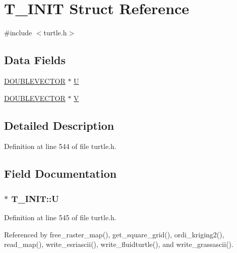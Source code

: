 \hypertarget{struct_t___i_n_i_t}{\section{T\-\_\-\-I\-N\-I\-T Struct Reference}
\label{struct_t___i_n_i_t}
}


{\ttfamily \#include $<$turtle.\-h$>$}

\subsection*{Data Fields}
\begin{DoxyCompactItemize}
\item 
\hyperlink{struct_d_o_u_b_l_e_v_e_c_t_o_r}{D\-O\-U\-B\-L\-E\-V\-E\-C\-T\-O\-R} $\ast$ \hyperlink{struct_t___i_n_i_t_a6a9fb1ffc74a515a21385de24f49d65e}{U}
\item 
\hyperlink{struct_d_o_u_b_l_e_v_e_c_t_o_r}{D\-O\-U\-B\-L\-E\-V\-E\-C\-T\-O\-R} $\ast$ \hyperlink{struct_t___i_n_i_t_a41a9ade275df71c2a10a03b75917244a}{V}
\end{DoxyCompactItemize}


\subsection{Detailed Description}


Definition at line 544 of file turtle.\-h.



\subsection{Field Documentation}
\hypertarget{struct_t___i_n_i_t_a6a9fb1ffc74a515a21385de24f49d65e}{
\subsubsection[{U}]{$\ast$ T\-\_\-\-I\-N\-I\-T\-::\-U}}\label{struct_t___i_n_i_t_a6a9fb1ffc74a515a21385de24f49d65e}


Definition at line 545 of file turtle.\-h.



Referenced by free\-\_\-raster\-\_\-map(), get\-\_\-square\-\_\-grid(), ordi\-\_\-kriging2(), read\-\_\-map(), write\-\_\-esriascii(), write\-\_\-fluidturtle(), and write\-\_\-grassascii().


